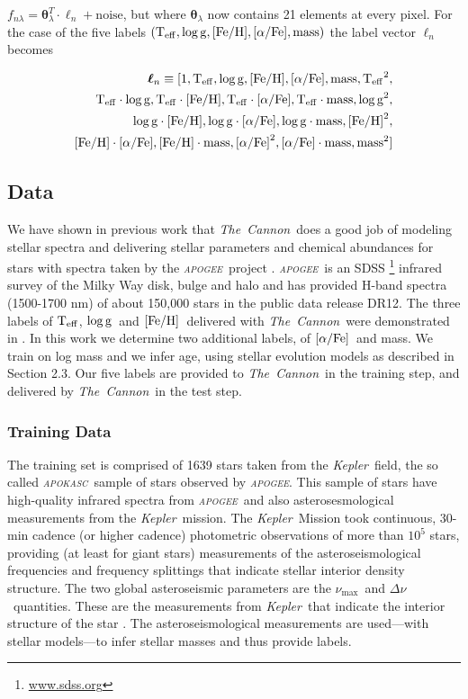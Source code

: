 \documentclass[12pt, preprint]{aastex}
\newcommand{\project}[1]{\textsl{#1}}
\newcommand{\tc}{\project{The~Cannon}}
\newcommand{\apogee}{\project{\textsc{apogee}}}
\newcommand{\apokasc}{\project{\textsc{apokasc}}}
\newcommand{\kepler}{\project{Kepler}}
\newcommand{\teff}{\mbox{$\rm T_{eff}$}}
\newcommand{\feh}{\mbox{$\rm [Fe/H]$}}
\newcommand{\alphafe}{\mbox{$\rm [\alpha/Fe]$}}
\newcommand{\logg}{\mbox{$\rm \log g$}}
\newcommand{\set}[1]{\bm{#1}}
\newcommand{\starlabel}{\ell}
\newcommand{\starlabelvec}{\set{\starlabel}}
\newcommand{\numax}{$\nu_{\max}$}
\newcommand{\deltanu}{$\Delta\nu$}
\begin{document}
$f_{n\lambda} =
\set{\theta}_\lambda^T \cdot \starlabelvec_n + \mbox{noise}$, 
but where $\set{\theta}_\lambda$ now contains 21 elements at every pixel. For the case of the five labels $(\teff , \logg , \feh, \alphafe, \mbox{mass})$ the label vector $\starlabelvec_n$
becomes  

\begin{equation}
\begin{split}
\starlabelvec_n \equiv  [1, \teff, \logg, \feh, \alphafe, \mbox{mass}, \teff^2, \\
 \teff\cdot\logg, \teff\cdot\feh, \teff\cdot\alphafe, \teff\cdot \mbox{mass},  \logg^2, \\
  \logg\cdot\feh, \logg\cdot\alphafe, \logg\cdot \mbox{mass}, \feh^2, \\
  \feh\cdot\alphafe, \feh\cdot \mbox{mass}, \alphafe^2, \alphafe\cdot \mbox{mass}, \mbox{mass}^2]
\end{split}
 \label{eq:quad}
\end{equation}


\subsection{Data}

We have shown in previous work \citep{Ness2015} that \tc\ does a good job
of modeling stellar spectra and delivering stellar parameters and
chemical abundances for stars with spectra taken by the \apogee\ project \citep{Majewski2012}.  \apogee\ is an SDSS \footnote{\url{www.sdss.org}}  \citep{E2011} infrared survey of the Milky Way disk, bulge and halo and has provided H-band spectra (1500-1700 nm) of about 150,000 stars in the public data release DR12.  
The three labels of \teff, \logg\ and \feh\ delivered with \tc\ were demonstrated in \citet{Ness2015}.  In this work we determine two additional labels, of \alphafe\ and mass. We train on log mass and we infer age, using stellar evolution models as described in Section 2.3. Our five labels are provided to \tc\ in the training step, and delivered by \tc\ in the test step.

\subsubsection{Training Data} 


 The training set is comprised of 1639 stars taken from the \kepler\ field, the so called \apokasc\ sample \citep{P2014}  of stars observed by \apogee.
This sample of stars have high-quality infrared
spectra from \apogee\ and also asterosesmological measurements from the \kepler\ mission.
The \kepler\ Mission \citep{B2010} took continuous, 30-min cadence (or
higher cadence) photometric observations of more than $10^5$ stars,
providing (at least for giant stars) measurements of the
asteroseismological frequencies and frequency splittings that indicate
stellar interior density structure.
The two global asteroseismic parameters are the \numax\ and \deltanu\ quantities. These are the measurements from \kepler\ that indicate the interior structure of the star \citep[see][and references therein]{P2014}.
The asteroseismological measurements are used---with stellar models---to infer stellar masses and thus provide labels.
\end{document}
